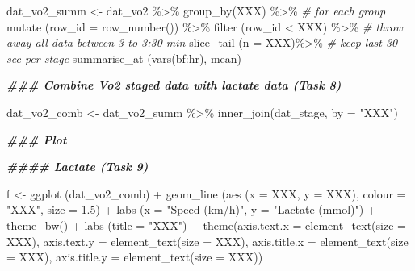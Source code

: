 \documentclass[
]{book}
\newenvironment{Shaded}{\begin{snugshade}}{\end{snugshade}}
\newcommand{\AttributeTok}[1]{\textcolor[rgb]{0.77,0.63,0.00}{#1}}
\newcommand{\CommentTok}[1]{\textcolor[rgb]{0.56,0.35,0.01}{\textit{#1}}}
\newcommand{\DocumentationTok}[1]{\textcolor[rgb]{0.56,0.35,0.01}{\textbf{\textit{#1}}}}
\newcommand{\FloatTok}[1]{\textcolor[rgb]{0.00,0.00,0.81}{#1}}
\newcommand{\FunctionTok}[1]{\textcolor[rgb]{0.00,0.00,0.00}{#1}}
\newcommand{\NormalTok}[1]{#1}
\newcommand{\OtherTok}[1]{\textcolor[rgb]{0.56,0.35,0.01}{#1}}
\newcommand{\SpecialCharTok}[1]{\textcolor[rgb]{0.00,0.00,0.00}{#1}}
\newcommand{\StringTok}[1]{\textcolor[rgb]{0.31,0.60,0.02}{#1}}
\begin{document}
\begin{Shaded}
\begin{Highlighting}[]
\NormalTok{dat\_vo2\_summ }\OtherTok{\textless{}{-}}\NormalTok{ dat\_vo2 }\SpecialCharTok{\%\textgreater{}\%}
  \FunctionTok{group\_by}\NormalTok{(XXX) }\SpecialCharTok{\%\textgreater{}\%} \CommentTok{\# for each group}
  \FunctionTok{mutate}\NormalTok{ (}\AttributeTok{row\_id =} \FunctionTok{row\_number}\NormalTok{()) }\SpecialCharTok{\%\textgreater{}\%}
  \FunctionTok{filter}\NormalTok{ (row\_id }\SpecialCharTok{\textless{}}\NormalTok{ XXX) }\SpecialCharTok{\%\textgreater{}\%} \CommentTok{\# throw away all data between 3 to 3:30 min}
  \FunctionTok{slice\_tail}\NormalTok{ (}\AttributeTok{n =}\NormalTok{ XXX)}\SpecialCharTok{\%\textgreater{}\%} \CommentTok{\# keep last 30 sec per stage}
  \FunctionTok{summarise\_at}\NormalTok{ (}\FunctionTok{vars}\NormalTok{(bf}\SpecialCharTok{:}\NormalTok{hr), mean)}

\DocumentationTok{\#\#\# Combine Vo2 staged data with lactate data (Task 8)}

\NormalTok{dat\_vo2\_comb }\OtherTok{\textless{}{-}}\NormalTok{ dat\_vo2\_summ }\SpecialCharTok{\%\textgreater{}\%}
  \FunctionTok{inner\_join}\NormalTok{(dat\_stage, }\AttributeTok{by =} \StringTok{"XXX"}\NormalTok{)}

\DocumentationTok{\#\#\# Plot}

\DocumentationTok{\#\#\#\# Lactate (Task 9)}

\NormalTok{f }\OtherTok{\textless{}{-}} \FunctionTok{ggplot}\NormalTok{ (dat\_vo2\_comb) }\SpecialCharTok{+}
  \FunctionTok{geom\_line}\NormalTok{ (}\FunctionTok{aes}\NormalTok{ (}\AttributeTok{x =}\NormalTok{ XXX, }\AttributeTok{y =}\NormalTok{ XXX), }\AttributeTok{colour =} \StringTok{"XXX"}\NormalTok{, }\AttributeTok{size =} \FloatTok{1.5}\NormalTok{) }\SpecialCharTok{+} 
  \FunctionTok{labs}\NormalTok{ (}\AttributeTok{x =} \StringTok{"Speed (km/h)"}\NormalTok{,}
        \AttributeTok{y =} \StringTok{"Lactate (mmol)"}\NormalTok{) }\SpecialCharTok{+}
  \FunctionTok{theme\_bw}\NormalTok{() }\SpecialCharTok{+} 
  \FunctionTok{labs}\NormalTok{ (}\AttributeTok{title =} \StringTok{"XXX"}\NormalTok{) }\SpecialCharTok{+} 
  \FunctionTok{theme}\NormalTok{(}\AttributeTok{axis.text.x =} \FunctionTok{element\_text}\NormalTok{(}\AttributeTok{size =}\NormalTok{ XXX),}
        \AttributeTok{axis.text.y =} \FunctionTok{element\_text}\NormalTok{(}\AttributeTok{size =}\NormalTok{ XXX),  }
        \AttributeTok{axis.title.x =} \FunctionTok{element\_text}\NormalTok{(}\AttributeTok{size =}\NormalTok{ XXX),}
        \AttributeTok{axis.title.y =} \FunctionTok{element\_text}\NormalTok{(}\AttributeTok{size =}\NormalTok{ XXX))}


\end{Highlighting}
\end{Shaded}
\end{document}
